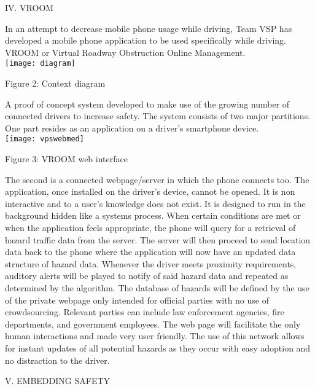 \documentclass[11pt]{article}
\begin{document}
\begin{multicols}{2}
\begin{center}
	IV. VROOM
\end{center}
In an attempt to decrease mobile phone usage while driving, Team VSP has developed a mobile phone application to be used specifically while driving. VROOM or Virtual Roadway Obstruction Online Management. 
\\
\texttt{[image: diagram]}
\begin{center}
{\footnotesize Figure 2: Context diagram}
\end{center}
A proof of concept system developed to make use of the growing number of connected drivers to increase safety. The system consists of two major partitions. One part resides as an application on a driver's smartphone device.
\\
\texttt{[image: vpswebmed]}
\begin{center}
{\footnotesize Figure 3: VROOM web interface}
\end{center}
The second is a connected webpage/server in which the phone connects too. The application, once installed on the driver’s device, cannot be opened. It is non interactive and to a user's knowledge does not exist. It is designed to run in the background hidden like a systems process. When certain conditions are met or when the application feels appropriate, the phone will query for a retrieval of hazard traffic data from the server. The server will then proceed to send location data back to the phone where the application will now have an updated data structure of hazard data. Whenever the driver meets proximity requirements, auditory alerts will be played to notify of said hazard data and repeated as determined by the algorithm. The database of hazards will be defined by the use of the private webpage only intended for official parties with no use of crowdsourcing. Relevant parties can include law enforcement agencies, fire departments, and government employees. The web page will facilitate the only human interactions and made very user friendly. The use of this network allows for instant updates of all potential hazards as they occur with easy adoption and no distraction to the driver.
\begin{center}
	V. EMBEDDING SAFETY
\end{center}

\end{multicols}
\end{document}
